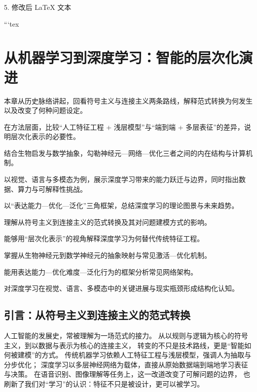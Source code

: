 5. 修改后 LaTeX 文本

```tex
\chapter{从机器学习到深度学习：智能的层次化演进}

\begin{introduction}
  \item 本章从历史脉络讲起，回看符号主义与连接主义两条路线，解释范式转换为何发生以及改变了何种问题设定。
  \item 在方法层面，比较“人工特征工程 + 浅层模型”与“端到端 + 多层表征”的差异，说明层次化表示的必要性。
  \item 结合生物启发与数学抽象，勾勒神经元—网络—优化三者之间的内在结构与计算机制。
  \item 以视觉、语言与多模态为例，展示深度学习带来的能力跃迁与边界，同时指出数据、算力与可解释性挑战。
  \item 以“表达能力—优化—泛化”三角框架，总结深度学习的理论图景与未来趋势。
\end{introduction}

\begin{introduction}
  \item 理解从符号主义到连接主义的范式转换及其对问题建模方式的影响。
  \item 能够用“层次化表示”的视角解释深度学习为何替代传统特征工程。
  \item 掌握从生物神经元到数学神经元的抽象映射与常见激活—优化机制。
  \item 能用表达能力—优化难度—泛化行为的框架分析常见网络架构。
  \item 对深度学习在视觉、语言、多模态中的关键进展与现实瓶颈形成结构化认知。
\end{introduction}

\section{引言：从符号主义到连接主义的范式转换}

人工智能的发展史，常被理解为一场范式的接力。  
从以规则与逻辑为核心的符号主义，到以数据与表示为核心的连接主义，  
转变的不只是技术路线，更是“智能如何被建模”的方式。  
传统机器学习依赖人工特征工程与浅层模型，强调人为抽取与分步优化；  
深度学习以多层神经网络为载体，直接从原始数据端到端地学习表征与决策。  
在语音识别、图像理解等任务上，这一改道改变了可解问题的边界，  
也刷新了我们对“学习”的认识：特征不只是被设计，更可以被学习。

